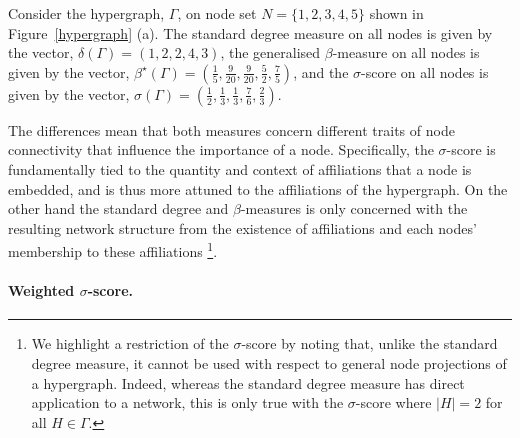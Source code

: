 \begin{example} \label{comparedegree}
Consider the hypergraph, $\Gamma $, on node set $N = \{ 1, 2, 3, 4, 5\}$ shown in Figure~\ref{hypergraph} (a). The standard degree measure on all nodes is given by the vector, $\delta(\Gamma ) = ( 1, 2, 2, 4, 3)$, the generalised $\beta$-measure on all nodes is given by the vector, $\beta^{\star}(\Gamma) = ( \frac{1}{5}, \frac{9}{20}, \frac{9}{20}, \frac{5}{2}, \frac{7}{5} )$, and the $\sigma$-score on all nodes is given by the vector, $\sigma(\Gamma ) = ( \frac{1}{2} , \frac{1}{3}, \frac{1}{3}, \frac{7}{6}, \frac{2}{3} )$.
\end{example}

The differences mean that both measures concern different traits of node connectivity that influence the importance of a node. Specifically, the $\sigma$-score is fundamentally tied to the quantity and context of affiliations that a node is embedded, and is thus more attuned to the affiliations of the hypergraph. On the other hand the standard degree and $\beta$-measures is only concerned with the resulting network structure from the existence of affiliations and each nodes' membership to these affiliations \footnote{We highlight a restriction of the $\sigma$-score by noting that, unlike the standard degree measure, it cannot be used with respect to general node projections of a hypergraph. Indeed, whereas the standard degree measure has direct application to a network, this is only true with the $\sigma$-score where $| H | = 2$ for all $H \in \Gamma$.}.

\paragraph{Weighted $\sigma$-score.}

